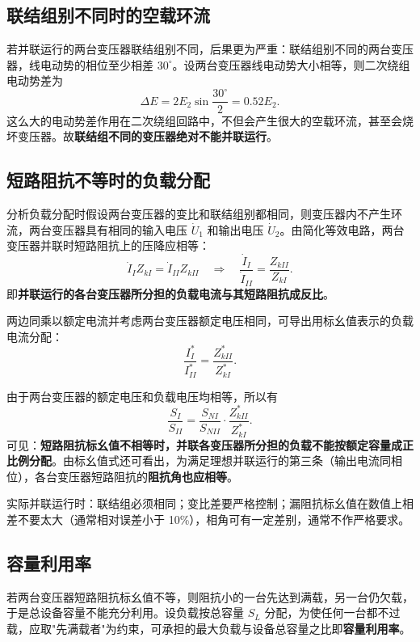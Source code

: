 \subsection{联结组别不同时的空载环流}
若并联运行的两台变压器联结组别不同，后果更为严重：联结组别不同的两台变压器，线电动势的相位至少相差 $30^\circ$。设两台变压器线电动势大小相等，则二次绕组电动势差为
\begin{equation}
\Delta E=2E_{2}\sin\frac{30^\circ}{2}=0.52E_2 .
\end{equation}
这么大的电动势差作用在二次绕组回路中，不但会产生很大的空载环流，甚至会烧坏变压器。故\textbf{联结组不同的变压器绝对不能并联运行}。

\subsection{短路阻抗不等时的负载分配}
分析负载分配时假设两台变压器的变比和联结组别都相同，则变压器内不产生环流，两台变压器具有相同的输入电压 $\dot U_1$ 和输出电压 $\dot U_2$。由简化等效电路，两台变压器并联时短路阻抗上的压降应相等：
\begin{equation}
\dot I_I Z_{kI}=\dot I_{II}Z_{kII}
\quad\Longrightarrow\quad
\frac{\dot I_I}{\dot I_{II}}=\frac{Z_{kII}}{Z_{kI}} .
\end{equation}
即\textbf{并联运行的各台变压器所分担的负载电流与其短路阻抗成反比}。

两边同乘以额定电流并考虑两台变压器额定电压相同，可导出用标幺值表示的负载电流分配：
\begin{equation}
\frac{I_I^{*}}{I_{II}^{*}}=\frac{Z_{kII}^{*}}{Z_{kI}^{*}} .
\end{equation}


由于两台变压器的额定电压和负载电压均相等，所以有
\begin{equation}
\frac{S_I}{S_{II}}=\frac{S_{NI}}{S_{NII}}\cdot\frac{Z_{kII}^{*}}{Z_{kI}^{*}} .
\end{equation}
可见：\textbf{短路阻抗标幺值不相等时，并联各变压器所分担的负载不能按额定容量成正比例分配}。由标幺值式还可看出，为满足理想并联运行的第三条（输出电流同相位），各台变压器短路阻抗的\textbf{阻抗角也应相等}。

实际并联运行时：联结组必须相同；变比差要严格控制；漏阻抗标幺值在数值上相差不要太大（通常相对误差小于 10\%），相角可有一定差别，通常不作严格要求。

\subsection{容量利用率}
若两台变压器短路阻抗标幺值不等，则阻抗小的一台先达到满载，另一台仍欠载，于是总设备容量不能充分利用。设负载按总容量 $S_L$ 分配，为使任何一台都不过载，应取"先满载者"为约束，可承担的最大负载与设备总容量之比即\textbf{容量利用率}。


